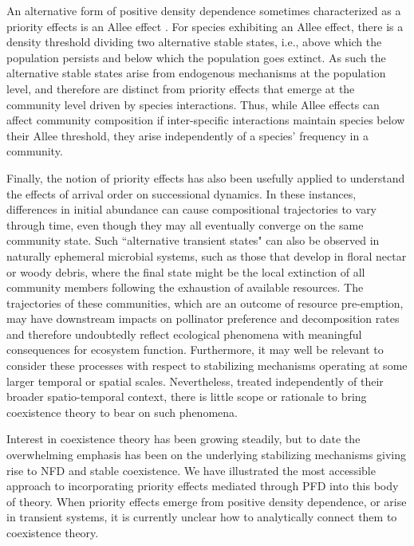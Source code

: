 An alternative form of positive density dependence sometimes characterized as a priority effects is an Allee effect \citep{Petraitis2013}. For species exhibiting an Allee effect, there is a density threshold dividing two alternative stable states, i.e., above which the population persists and below which the population goes extinct. As such the alternative stable states arise from endogenous mechanisms at the population level, and therefore are distinct from priority effects that emerge at the community level driven by species interactions. Thus, while Allee effects can affect community composition if inter-specific interactions maintain species below their Allee threshold, they arise independently of a species' frequency in a community. 
\par


Finally, the notion of priority effects has also been usefully applied to understand the effects of arrival order on successional dynamics. In these instances, differences in initial abundance can cause compositional trajectories to vary through time, even though they may all eventually converge on the same community state. Such ``alternative transient states" \citep{FukamiNakajima2011} can also be observed in naturally ephemeral microbial systems, such as those that develop in floral nectar or woody debris, where the final state might be the local extinction of all community members following the exhaustion of available resources. The trajectories of these communities, which are an outcome of resource pre-emption, may have downstream impacts on pollinator preference and decomposition rates and therefore undoubtedly reflect ecological phenomena with meaningful consequences for ecosystem function. Furthermore, it may well be relevant to consider these processes with respect to stabilizing mechanisms operating at some larger temporal or spatial scales. Nevertheless, treated independently of their broader spatio-temporal context, there is little scope or rationale to bring coexistence theory to bear on such phenomena. 
\par


Interest in coexistence theory has been growing steadily, but to date the overwhelming emphasis has been on the underlying stabilizing mechanisms giving rise to NFD and stable coexistence. We have illustrated the most accessible approach to incorporating priority effects mediated through PFD into this body of theory. When priority effects emerge from positive density dependence, or arise in transient systems, it is currently unclear how to analytically connect them to coexistence theory. 
\par



